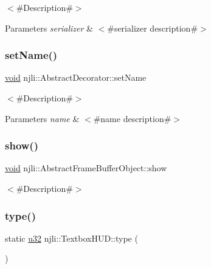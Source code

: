 $<$\#\+Description\#$>$


\begin{DoxyParams}{Parameters}
{\em serializer} & $<$\#serializer description\#$>$ \\
\hline
\end{DoxyParams}
\mbox{\label{classnjli_1_1_textbox_h_u_d_a087eb5f8d9f51cc476f12f1d10a3cb95}} 
\subsubsection{\texorpdfstring{set\+Name()}{setName()}}
{\footnotesize\ttfamily \mbox{\hyperlink{_thread_8h_af1e856da2e658414cb2456cb6f7ebc66}{void}} njli\+::\+Abstract\+Decorator\+::set\+Name}

$<$\#\+Description\#$>$


\begin{DoxyParams}{Parameters}
{\em name} & $<$\#name description\#$>$ \\
\hline
\end{DoxyParams}
\mbox{\label{classnjli_1_1_textbox_h_u_d_a73ffd499fceaacd59b518a541ed2133e}} 
\subsubsection{\texorpdfstring{show()}{show()}}
{\footnotesize\ttfamily \mbox{\hyperlink{_thread_8h_af1e856da2e658414cb2456cb6f7ebc66}{void}} njli\+::\+Abstract\+Frame\+Buffer\+Object\+::show}

$<$\#\+Description\#$>$ \mbox{\label{classnjli_1_1_textbox_h_u_d_ab31dc92abf94cdd2dbce4ac4d968b01c}} 
\subsubsection{\texorpdfstring{type()}{type()}}
{\footnotesize\ttfamily static \mbox{\hyperlink{_util_8h_a10e94b422ef0c20dcdec20d31a1f5049}{u32}} njli\+::\+Textbox\+H\+U\+D\+::type (\begin{DoxyParamCaption}{ }\end{DoxyParamCaption})\hspace{0.3cm}{\ttfamily [static]}}

